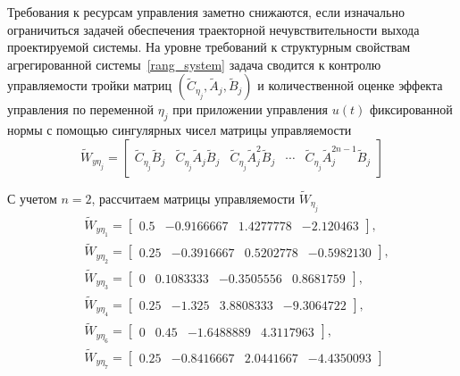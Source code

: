 Требования к ресурсам управления заметно снижаются, если изначально ограничиться задачей обеспечения траекторной нечувствительности выхода проектируемой системы. На уровне требований к структурным свойствам агрегированной системы~\ref{rang_system} задача сводится к контролю управляемости тройки матриц $(\tilde{C}_{\eta_j}, \tilde{A}_{j}, \tilde{B}_{j})$ и количественной оценке эффекта управления по переменной $\eta_j$ при приложении управления $u(t)$ фиксированной нормы с помощью сингулярных чисел матрицы управляемости
\begin{equation}
	\tilde{W}_{y \eta_j} =
	\begin{bmatrix}
		\tilde{C}_{\eta_j} \tilde{B}_{j} &
		\tilde{C}_{\eta_j} \tilde{A}_{j} \tilde{B}_{j} &
		\tilde{C}_{\eta_j} \tilde{A}_{j}^2 \tilde{B}_{j} &		
		\cdots &
		\tilde{C}_{\eta_j} \tilde{A}_{j}^{2n-1} \tilde{B}_{j}
	\end{bmatrix}
\end{equation}

С учетом $n = 2$, рассчитаем матрицы управляемости $\tilde{W}_{\eta_j}$
\begin{align*}
	&\tilde{W}_{y \eta_{1}} =
	\begin{bmatrix}
		0.5  & - 0.9166667  &  1.4277778 & - 2.120463   
	\end{bmatrix}, 
	\\
	&\tilde{W}_{y \eta_2} =
	\begin{bmatrix}
		0.25 &  - 0.3916667 &   0.5202778 & - 0.5982130  	
	\end{bmatrix}, 
	\\
	&\tilde{W}_{y \eta_3} =
	\begin{bmatrix}
		0   &   0.1083333 & - 0.3505556 &   0.8681759  
	\end{bmatrix}, 
	\\
	&\tilde{W}_{y \eta_4} =
	\begin{bmatrix}
		0.25 & - 1.325    &    3.8808333 & - 9.3064722  
	\end{bmatrix}, 
	\\
	&\tilde{W}_{y \eta_6} =
	\begin{bmatrix}
		0   &   0.45   &    - 1.6488889  &  4.3117963  
	\end{bmatrix}, 
	\\
	&\tilde{W}_{y \eta_7} =
	\begin{bmatrix}
		0.25 & - 0.8416667 &   2.0441667 & - 4.4350093
	\end{bmatrix}
\end{align*}

